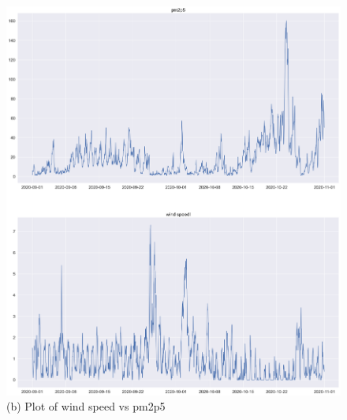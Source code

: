 \documentclass{article}
\begin{document}
\begin{figure}[h!]
\begin{minipage}[t]{0.4\textwidth}
      \includegraphics[scale=0.18]{plotwind.png}
      \caption{(b) Plot of wind speed vs pm2p5 }
    \end{minipage}
  \end{figure}
  
\end{document}
